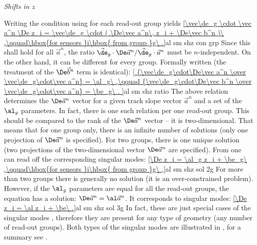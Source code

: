 
\baselineskip
\indent\em{Shifts in $z$}
\baselineskip

Writing the condition  using  for each read-out group yields
\eqref{\vec\de_g \cdot \vec a^n \De z_i = \vec\de_g \cdot (
	\De\vec a^n\, z_i + \De\vec b^n
)\ ,\qquad\hbox{for sensors }i\hbox{ from group }g\ .}{al sm shz con grp}
Since this shall hold for all $\vec a^n$, the ratio $\vec\de_g\cdot\De\vec a^n / \vec\de_g\cdot\vec a^n$ must be $n$-independent. On the other hand, it can be different for every group. Formally written (the treatment of the $\De\vec b^n$ term is identical):
\eqref{
{\vec\de_g\cdot\De\vec a^n \over \vec\de_g\cdot\vec a^n} = \al_g\ ,\qquad
{\vec\de_g\cdot\De\vec b^n \over \vec\de_g\cdot\vec a^n} = \be_g\ .
}{al sm shz ratio}
The above relation determines the $\De\vec a^n$ vector for a given track slope vector $\vec a^n$ and a set of the $\al_g$ parameters. In fact, there is one such relation per one read-out group. This should be compared to the rank of the $\De\vec a^n$ vector -- it is two-dimensional. That means that for one group only, there is an infinite number of solutions (only one projection of $\De\vec a^n$ is specified). For two groups, there is one unique solution (two projections of the two-dimensional vector $\De\vec a^n$ are specified). From  one can read off the corresponding singular modes:
\eqref{\De z_i = \al_g z_i + \be_g\ ,\qquad\hbox{for sensors }i\hbox{ from group }g\ ,}{al sm shz sol 2g}
For more than two groups there is generally no solution (it is an over-constrained problem). However, if the $\al_g$ parameters are equal for all the read-out groups, the equation has a solution: $\De\vec a^n = \al \vec a^n$. It corresponds to singular modes:
\eqref{\De z_i = \al z_i + \be\ .}{al sm shz sol 3g}
In fact, these are just special cases of the singular modes , therefore they are present for any type of geometry (any number of read-out groups). Both types of the singular modes are illustrated in , for a summary see .


